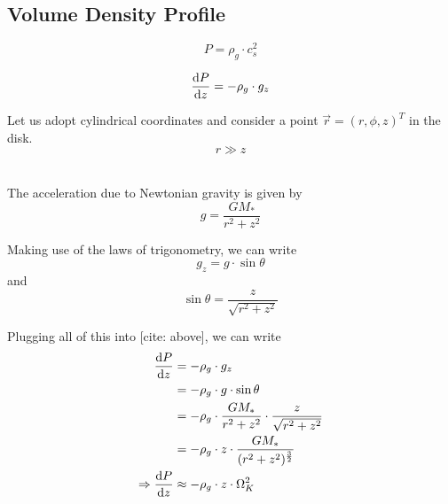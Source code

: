    \newpage\subsection{Volume Density Profile}

        \begin{equation}
            P = \rho_g \cdot c_s^2
        \end{equation}

        \begin{equation}
            \deriv{P}{z} = - \rho_g \cdot g_z  %
        \end{equation}

        Let us adopt cylindrical coordinates and consider a point $\vec r=(r,\phi,z)^T$ in the 
        disk. \\  %

        \begin{equation*}
            r\gg z 
        \end{equation*}

         \\
        

        The acceleration due to Newtonian gravity is given by
        \begin{equation}
            g=\frac{GM_*}{r^2+z^2}
        \end{equation}

        Making use of the laws of trigonometry, we can write
        \begin{equation}
            g_z=g\cdot\sin\theta
        \end{equation}
        and
        \begin{equation}
            \sin\theta=\frac{z}{\sqrt{r^2+z^2}}
        \end{equation}

        Plugging all of this into [cite: above], we can write
        \begin{align}
            \frac{\text{d} P}{\text{d} z}
                &= -\rho_g \cdot g_z \\
                &= -\rho_g \cdot g \cdot \sin\theta \\
                &= -\rho_g \cdot \frac{GM_*}{r^2+z^2} \cdot\frac{z}{\sqrt{r^2+z^2}} \\
                &= -\rho_g \cdot z \cdot\frac{GM_*}{ (r^2+z^2)^{\frac{3}{2}} } \\
            \Rightarrow
            \frac{\text{d} P}{\text{d} z}
                &\approx -\rho_g \cdot z \cdot \Omega_K^2
        \end{align}

